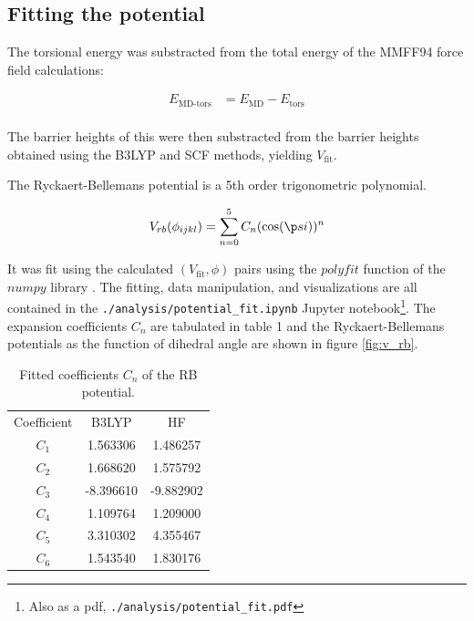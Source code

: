 \documentclass[10pt]{article}
\begin{document}
\subsection{Fitting the potential}

The torsional energy was substracted from the total energy of the MMFF94 force field calculations:

\begin{align}
E_{\text{MD-tors}} &= E_{\text{MD}} - E_{\text{tors}}\\
\end{align}

The barrier heights of this were then substracted from the barrier heights obtained using the B3LYP and SCF methods, yielding $V_{\text{fit}}$. 

The Ryckaert-Bellemans potential is a 5th order trigonometric polynomial. 

\begin{align}
V_{rb}(\phi_{ijkl}) = \sum_{n=0}^5 C_n (\cos (\p si))^n
\end{align}

It was fit using the calculated $(V_{\text{fit}}, \phi)$ pairs using the $polyfit$ function of the $numpy$ library \cite{numpy}. The fitting, data manipulation, and visualizations are all contained in the \texttt{./analysis/potential\_fit.ipynb} Jupyter notebook\footnote{Also as a pdf, \texttt{\texttt{./analysis/potential\_fit.pdf}} }. The expansion coefficients $C_n$ are tabulated in table 1 and the Ryckaert-Bellemans  potentials as the function of dihedral angle are shown in figure \ref{fig:v_rb}.

\begin{table}[ht!]
	\centering
	\label{my-label}
	\begin{tabular}{ccc}
		Coefficient & B3LYP  &      HF       \\
		$C_1$ & 1.563306 &  1.486257 \\
		$C_2$ & 1.668620 &  1.575792 \\
		$C_3$ &-8.396610 & -9.882902 \\
		$C_4$ & 1.109764 &  1.209000 \\
		$C_5$ & 3.310302 &  4.355467 \\
		$C_6$ & 1.543540 &  1.830176
	\end{tabular}
	\caption{Fitted coefficients $C_n$ of the RB potential.}
\end{table}
\end{document}
